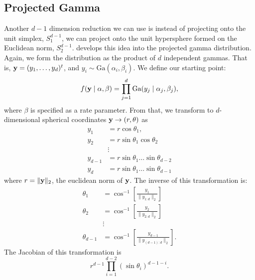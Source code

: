 \subsection{Projected Gamma}
\label{method:pg}
Another $d-1$ dimension reduction we can use is instead of projecting onto the unit simplex,
  $S_{1}^{d-1}$, we can project onto the unit hypersphere formed on the Euclidean norm,
  $S_{2}^{d-1}$. \cite{nunez2019} develops this idea into the projected gamma distribution.  Again,
  we form the distribution as the product of $d$ independent gammas.  That is,
  ${\bf y} = (y_1,\ldots,y_d)^t$, and $y_i\sim\text{Ga}(\alpha_i,\beta_i)$.  We define our
  starting point:
  \begin{equation}
    f({\bf y}\mid{\bf \alpha},{\bf \beta}) = \prod_{j = 1}^d\text{Ga}(y_j\mid\alpha_j,\beta_j),
  \end{equation}
  where $\beta$ is specified as a rate parameter.  From that, we transform to
  $d$-dimensional spherical coordinates ${\bf y} \rightarrow (r,{\bf \theta})$ as
  \begin{equation}
    \label{eqn:transform}
    \begin{aligned}
      y_1     &= r\cos\theta_1,\\
      y_2     &= r\sin\theta_1\cos\theta_2\\
              &\vdots\\
      y_{d-1} &= r\sin\theta_1\ldots\sin\theta_{d-2}\\
      y_{d}   &= r\sin\theta_1\ldots\sin\theta_{d-1}
    \end{aligned}
  \end{equation}
  where $r = \lVert {\bf y}\rVert_{2}$, the euclidean norm of ${\bf y}$.  The inverse of this
  transformation is:
  \begin{equation}
    \label{eqn:invtransform}
    \begin{aligned}
      \theta_1     &= \cos^{-1}\left[\frac{y_1}{\lVert y_{1:d}\rVert_2}\right]\\
      \theta_2     &= \cos^{-1}\left[\frac{y_2}{\lVert y_{2:d}\rVert_2}\right]\\
                   &\vdots\\
      \theta_{d-1} &= \cos^{-1}\left[\frac{y_{d-1}}{\lVert y_{(d-1):d}\rVert_2}\right].
    \end{aligned}
  \end{equation}
  The Jacobian of this transformation is
  \begin{equation*}
    r^{d-1}\prod_{i = 1}^{d-2}(\sin\theta_i)^{d-1-i}.
  \end{equation*}
